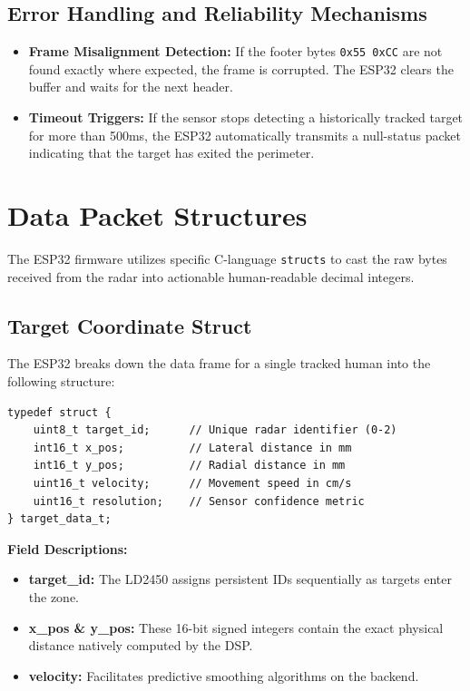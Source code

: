 \subsection{Error Handling and Reliability Mechanisms}
\label{subsec:error-handling}

\begin{itemize}
    \item \textbf{Frame Misalignment Detection:} If the footer bytes \texttt{0x55 0xCC} are not found exactly where expected, the frame is corrupted. The ESP32 clears the buffer and waits for the next header.
    \item \textbf{Timeout Triggers:} If the sensor stops detecting a historically tracked target for more than 500ms, the ESP32 automatically transmits a null-status packet indicating that the target has exited the perimeter.
\end{itemize}

\section{Data Packet Structures}
\label{sec:packet-structures}

The ESP32 firmware utilizes specific C-language \texttt{structs} to cast the raw bytes received from the radar into actionable human-readable decimal integers.

\subsection{Target Coordinate Struct}
\label{subsec:target-packet}

The ESP32 breaks down the data frame for a single tracked human into the following structure:

\begin{verbatim}
typedef struct {
    uint8_t target_id;      // Unique radar identifier (0-2)
    int16_t x_pos;          // Lateral distance in mm
    int16_t y_pos;          // Radial distance in mm
    uint16_t velocity;      // Movement speed in cm/s
    uint16_t resolution;    // Sensor confidence metric
} target_data_t;
\end{verbatim}

\textbf{Field Descriptions:}
\begin{itemize}
    \item \textbf{target\_id:} The LD2450 assigns persistent IDs sequentially as targets enter the zone.
    \item \textbf{x\_pos \& y\_pos:} These 16-bit signed integers contain the exact physical distance natively computed by the DSP.
    \item \textbf{velocity:} Facilitates predictive smoothing algorithms on the backend.
\end{itemize}

